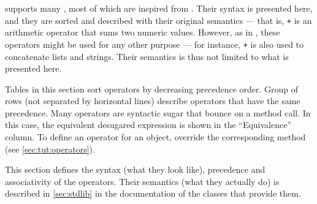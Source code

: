 \us supports many , most of which are inspired from
\Cxx. Their syntax is presented here, and they are sorted and described with
their original semantics --- that is, \lstinline|+| is an arithmetic
operator that sums two numeric values. However, as in \Cxx, these operators
might be used for any other purpose --- for instance, \lstinline|+| is also
used to concatenate lists and strings.  Their semantics is thus not limited
to what is presented here.

Tables in this section sort operators by decreasing precedence order.  Group
of rows (not separated by horizontal lines) describe operators that have the
same precedence. Many operators are syntactic sugar that bounce on a method
call. In this case, the equivalent desugared expression is shown in the
``Equivalence'' column.  To define an operator for an object, override the
corresponding method (see \autoref{sec:tut:operators}).

This section defines the syntax (what they look like), precedence and
associativity of the operators. Their semantics (what they actually do) is
described in \autoref{sec:stdlib} in the documentation of the classes that
provide them.


\newcommand{\operator}[6][]{%
  \lstinline@#2@ & \lstinline@#3@ & #4 & #5 & \lstinline@#6@#1%
}

\newcommand{\boperator}[3]{%
  \operator{#1}{a #1 b}{#2}{#3}{a.'#1'(b)}%
}

\newcommand{\poperator}[3]{%
  \operator{#1}{#1a}{#2}{#3}{a.'#1'()}%
}

\newcommand{\operatorin}     {\operator  {in}     {a in b}       {-}     {Membership}            {b.has(a)}          }
\newcommand{\operatornotin}  {\operator  {not in} {a not in b}   {-}     {Non-membership}        {b.hasNot(a)}      }
\newcommand{\operatorsub}    {\operator  {[]}   {a[args]}        {-}     {Subscript}             {a.'[]'(args)}          }
\newcommand{\operatorsubass} {\operator  {[] =} {a[args] = v}    {-}     {Subscript assignment}  {a.'[]='(args, v)}      }

\newcommand{\operatorprop}   {\operator  {->}   {a->b}             {-}     {Property access}        {getProperty("a", "b")} }
\newcommand{\operatorpropass}{\operator  {->}   {a->b = v}         {-}     {Property assignment}    {setProperty("a", "b", v)}}
\newcommand{\operatordot}    {\operator  {.}    {a.b}              {-}     {Message sending}        {Not redefinable}       }
\newcommand{\operatordota}   {\operator  {.}    {a.b(args)}        {-}     {Message sending}        {Not redefinable}       }
\newcommand{\operatorcolcol} {\operator  {.\&}   {a.\&b}             {-}     {Slot access}            {a.getSlot("b")}        }
\newcommand{\operatorass}[1][]{\operator[#1]
                                         {=}    {a = b}            {Right} {Assignment}             {updateSlot("a", b)}    }

